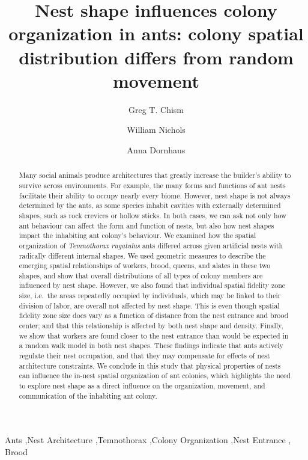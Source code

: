 \documentclass[3p]{elsarticle} %
\begin{document}
\begin{frontmatter}

  \title{Nest shape influences colony organization in ants: colony
spatial distribution differs from random movement}
    \author[a]{Greg T. Chism}
    \author[b]{William Nichols}
  
    \author[c]{Anna Dornhaus}
  
  
  \begin{abstract}
  Many social animals produce architectures that greatly increase the
  builder's ability to survive across environments. For example, the
  many forms and functions of ant nests facilitate their ability to
  occupy nearly every biome. However, nest shape is not always
  determined by the ants, as some species inhabit cavities with
  externally determined shapes, such as rock crevices or hollow sticks.
  In both cases, we can ask not only how ant behaviour can affect the
  form and function of nests, but also how nest shapes impact the
  inhabiting ant colony's behaviour. We examined how the spatial
  organization of \emph{Temnothorax rugatulus} ants differed across
  given artificial nests with radically different internal shapes. We
  used geometric measures to describe the emerging spatial relationships
  of workers, brood, queens, and alates in these two shapes, and show
  that overall distributions of all types of colony members are
  influenced by nest shape. However, we also found that individual
  spatial fidelity zone size, i.e.~the areas repeatedly occupied by
  individuals, which may be linked to their division of labor, are
  overall not affected by nest shape. This is even though spatial
  fidelity zone size does vary as a function of distance from the nest
  entrance and brood center; and that this relationship is affected by
  both nest shape and density. Finally, we show that workers are found
  closer to the nest entrance than would be expected in a random walk
  model in both nest shapes. These findings indicate that ants actively
  regulate their nest occupation, and that they may compensate for
  effects of nest architecture constraints. We conclude in this study
  that physical properties of nests can influence the in-nest spatial
  organization of ant colonies, which highlights the need to explore
  nest shape as a direct influence on the organization, movement, and
  communication of the inhabiting ant colony.
  \end{abstract}
    \begin{keyword}
    Ants \sep Nest Architecture \sep Temnothorax \sep Colony
Organization \sep Nest Entrance \sep 
    Brood
  \end{keyword}
  
 \end{frontmatter}
\end{document}

